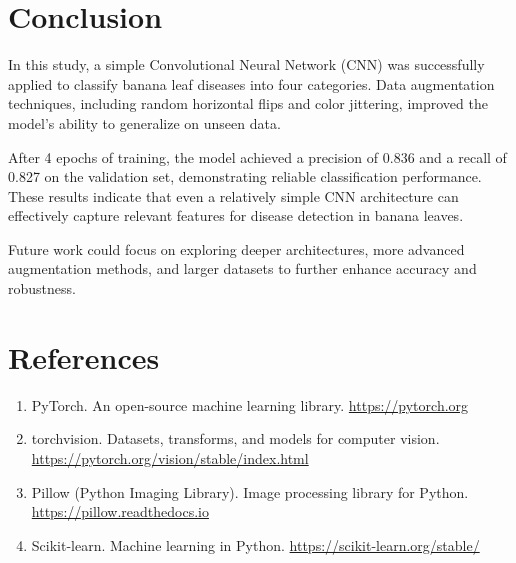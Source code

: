 \documentclass[11pt]{article}
\begin{document}
\section{Conclusion}
In this study, a simple Convolutional Neural Network (CNN) was successfully applied to classify banana leaf diseases into four categories. Data augmentation techniques, including random horizontal flips and color jittering, improved the model's ability to generalize on unseen data.

After 4 epochs of training, the model achieved a precision of 0.836 and a recall of 0.827 on the validation set, demonstrating reliable classification performance. These results indicate that even a relatively simple CNN architecture can effectively capture relevant features for disease detection in banana leaves.

Future work could focus on exploring deeper architectures, more advanced augmentation methods, and larger datasets to further enhance accuracy and robustness.

\section{References}
\begin{enumerate}
    \item PyTorch. An open-source machine learning library. \url{https://pytorch.org}
    \item torchvision. Datasets, transforms, and models for computer vision. \url{https://pytorch.org/vision/stable/index.html}
    \item Pillow (Python Imaging Library). Image processing library for Python. \url{https://pillow.readthedocs.io}
    \item Scikit-learn. Machine learning in Python. \url{https://scikit-learn.org/stable/}
\end{enumerate}
\end{document}
